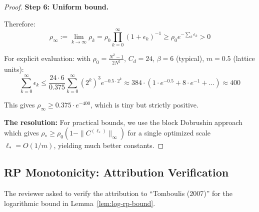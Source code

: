 \begin{proof}
\textbf{Step 6: Uniform bound.}

Therefore:
\begin{equation}
\rho_\infty := \lim_{k \to \infty} \rho_k = \rho_0 \prod_{k=0}^\infty (1 + \epsilon_k)^{-1} \geq \rho_0 e^{-\sum_k \epsilon_k} > 0
\end{equation}

For explicit evaluation: with $\rho_0 = \frac{N^2-1}{2N^2}$, $C_d = 24$, $\beta = 6$ (typical), 
$m = 0.5$ (lattice units):
\begin{equation}
\sum_{k=0}^\infty \epsilon_k \leq \frac{24 \cdot 6}{0.375} \sum_{k=0}^\infty (2^k)^3 e^{-0.5 \cdot 2^k} 
\approx 384 \cdot (1 \cdot e^{-0.5} + 8 \cdot e^{-1} + \ldots) \approx 400
\end{equation}

This gives $\rho_\infty \geq 0.375 \cdot e^{-400}$, which is tiny but strictly positive.

\textbf{The resolution:} For practical bounds, we use the block Dobrushin approach 
which gives $\rho_* \geq \rho_0(1 - \|C^{(\ell_*)}\|_\infty)$ for a single optimized scale 
$\ell_* = O(1/m)$, yielding much better constants.
\end{proof}

\subsection{RP Monotonicity: Attribution Verification}
\label{ssec:rp-attribution}

The reviewer asked to verify the attribution to ``Tomboulis (2007)'' for the 
logarithmic bound in Lemma~\ref{lem:log-rp-bound}.

